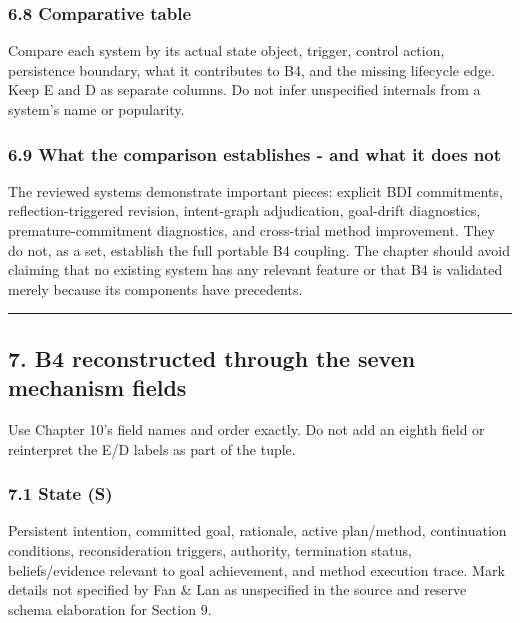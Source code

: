 \subsubsection{6.8 Comparative table}\label{comparative-table}

Compare each system by its actual state object, trigger, control action, persistence boundary, what it contributes to B4, and the missing lifecycle edge. Keep E and D as separate columns. Do not infer unspecified internals from a system's name or popularity.

\subsubsection{6.9 What the comparison establishes - and what it does not}\label{what-the-comparison-establishes---and-what-it-does-not}

The reviewed systems demonstrate important pieces: explicit BDI commitments, reflection-triggered revision, intent-graph adjudication, goal-drift diagnostics, premature-commitment diagnostics, and cross-trial method improvement. They do not, as a set, establish the full portable B4 coupling. The chapter should avoid claiming that no existing system has any relevant feature or that B4 is validated merely because its components have precedents.

\begin{center}\rule{0.5\linewidth}{0.5pt}\end{center}

\subsection{7. B4 reconstructed through the seven mechanism fields}\label{b4-reconstructed-through-the-seven-mechanism-fields}

Use Chapter 10's field names and order exactly. Do not add an eighth field or reinterpret the E/D labels as part of the tuple.

\subsubsection{7.1 State (S)}\label{state-s}

Persistent intention, committed goal, rationale, active plan/method, continuation conditions, reconsideration triggers, authority, termination status, beliefs/evidence relevant to goal achievement, and method execution trace. Mark details not specified by Fan \& Lan as unspecified in the source and reserve schema elaboration for Section 9.

